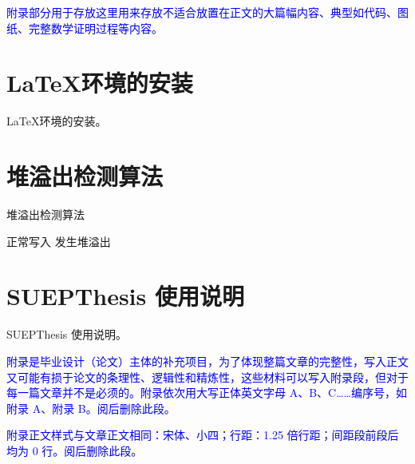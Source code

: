 %
%
%
%
%

\begin{appendices}
    
    \textcolor{blue}{附录部分用于存放这里用来存放不适合放置在正文的大篇幅内容、典型如代码、图纸、完整数学证明过程等内容。}
  
  
    \section{\LaTeX 环境的安装}
    \LaTeX 环境的安装。

    \newpage
    \section{堆溢出检测算法}
    \begin{algorithm}[h]
        \caption{堆溢出检测算法}\label{alg:ovf}
        \begin{algorithmic}[1]
                \STATE 正常写入
                \STATE 发生堆溢出
            \ENDIF
        \end{algorithmic}
    \end{algorithm}
    
    \newpage
    \section{SUEPThesis 使用说明}
    SUEPThesis 使用说明。
  
    \textcolor{blue}{附录是毕业设计（论文）主体的补充项目，为了体现整篇文章的完整性，写入正文又可能有损于论文的条理性、逻辑性和精炼性，这些材料可以写入附录段，但对于每一篇文章并不是必须的。附录依次用大写正体英文字母 A、B、C……编序号，如附录 A、附录 B。阅后删除此段。}
  
    \textcolor{blue}{附录正文样式与文章正文相同：宋体、小四；行距：1.25 倍行距；间距段前段后均为 0 行。阅后删除此段。}
  
\end{appendices}